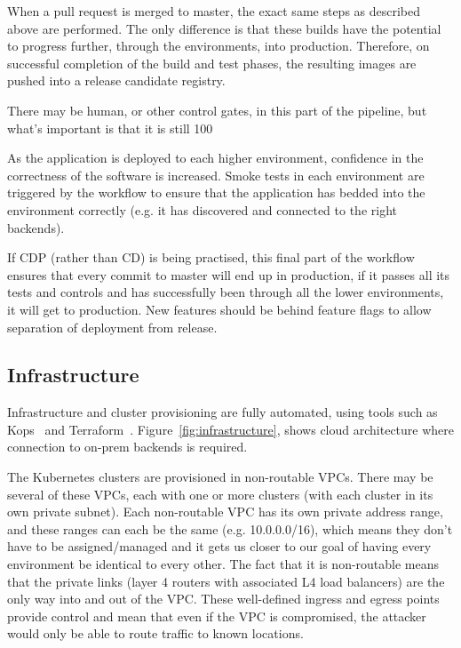 \documentclass[reprint,amsmath,amssymb,aps]{revtex4-1}
\begin{document}
When a pull request is merged to master, the exact same steps as described above are performed. The only difference is that these builds have the potential to progress further, through the environments, into production. Therefore, on successful completion of the build and test phases, the resulting images are pushed into a release candidate registry.

There may be human, or other control gates, in this part of the pipeline, but what’s important is that it is still 100%

As the application is deployed to each higher environment, confidence in the correctness of the software is increased. Smoke tests in each environment are triggered by the workflow to ensure that the application has bedded into the environment correctly (e.g. it has discovered and connected to the right backends).

If CDP (rather than CD) is being practised, this final part of the workflow ensures that every commit to master will end up in production, if it passes all its tests and controls and has successfully been through all the lower environments, it will get to production. New features should be behind feature flags to allow separation of deployment from release.

\subsection{\label{sec:infrastructure}Infrastructure}

Infrastructure and cluster provisioning are fully automated, using tools such as Kops~\cite{kubernet77:online} and Terraform~\cite{Terrafor77:online}. Figure~\ref{fig:infrastructure}, shows cloud architecture where connection to on-prem backends is required.

The Kubernetes clusters are provisioned in non-routable VPCs. There may be several of these VPCs, each with one or more clusters (with each cluster in its own private subnet). Each non-routable VPC has its own private address range, and these ranges can each be the same (e.g. 10.0.0.0/16), which means they don’t have to be assigned/managed and it gets us closer to our goal of having every environment be identical to every other. The fact that it is non-routable means that the private links (layer 4 routers with associated L4 load balancers) are the only way into and out of the VPC. These well-defined ingress and egress points provide control and mean that even if the VPC is compromised, the attacker would only be able to route traffic to known locations.
\end{document}
